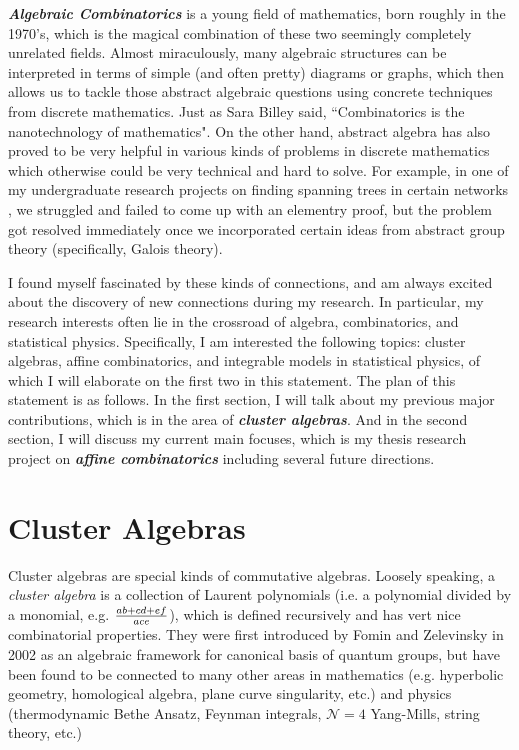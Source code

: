 \documentclass[11pt]{amsart}
\newcommand{\Emph}[1]{\textbf{\emph{#1}}}
\begin{document}
\Emph{Algebraic Combinatorics} is a young field of mathematics, born roughly in the 1970's, which is the magical combination of these two seemingly completely unrelated fields. %
Almost miraculously, many algebraic structures can be interpreted in terms of simple (and often pretty) diagrams or graphs, which then allows us to tackle those abstract algebraic questions using concrete techniques from discrete mathematics. Just as Sara Billey said, ``Combinatorics is the nanotechnology of mathematics". On the other hand, abstract algebra has also proved to be very helpful in various kinds of problems in discrete mathematics which otherwise could be very technical and hard to solve. For example, in one of my undergraduate research projects on finding spanning trees in certain networks \cite{arb}, we struggled and failed to come up with an elementry proof, but the problem got resolved immediately once we incorporated certain ideas from abstract group theory (specifically, Galois theory). 
%

I found myself fascinated by these kinds of connections, and am always excited about the discovery of new connections during my research.
In particular, my research interests often lie in the crossroad of algebra, combinatorics, and statistical physics. Specifically, I am interested the following topics: cluster algebras, affine combinatorics, and integrable models in statistical physics, of which I will elaborate on the first two in this statement. The plan of this statement is as follows. In the first section, I will talk about my previous major contributions, which is in the area of \Emph{cluster algebras}. And in the second section, I will discuss my current main focuses, which is my thesis research project on \Emph{affine combinatorics} including several future directions.%


\section{Cluster Algebras}
Cluster 	algebras are special kinds of commutative algebras. Loosely speaking, a \emph{cluster algebra} is a collection of Laurent polynomials (i.e. a polynomial divided by a monomial, e.g. $ab+cd+ef\over ace$), which is defined recursively and has vert nice combinatorial properties. They were first introduced by Fomin and Zelevinsky in 2002 as an algebraic framework for canonical basis of quantum groups, but have been found to be connected to many other areas in mathematics (e.g. hyperbolic geometry, homological algebra, plane curve singularity, etc.) and physics (thermodynamic Bethe Ansatz, Feynman integrals, $\mathcal{N}=4$ Yang-Mills, string theory, etc.) 
\end{document}

